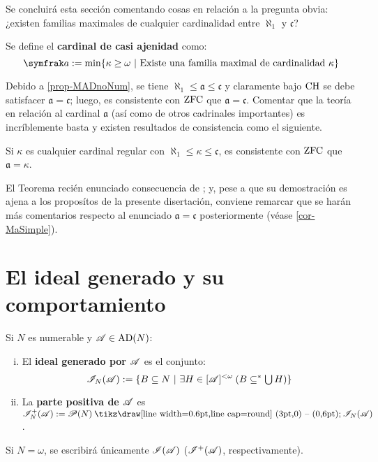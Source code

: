 	Se concluirá esta sección comentando cosas en relación a la pregunta obvia: ¿existen familias maximales de cualquier cardinalidad entre $\aleph_1$ y $\mathfrak{c}$?
	
	\begin{definicion}
		Se define el \textbf{cardinal de casi ajenidad} como: 
		$$ \mathfrak{a}:=\min\{ \kappa \geq \omega \tq \text{Existe una familia maximal de cardinalidad } \kappa \} $$
	\end{definicion}
	
	Debido a \ref{prop-MADnoNum}, se tiene $\aleph_1 \leq \mathfrak{a} \leq \mathfrak{c}$ y claramente bajo $\operatorname{CH}$ se debe satisfacer $\mathfrak{a}=\mathfrak{c}$; luego, es consistente con $\operatorname{ZFC}$ que $\mathfrak{a}=\mathfrak{c}$. Comentar que la teoría en relación al cardinal $\mathfrak{a}$ (así como de otros cadrinales importantes) es incríblemente basta y existen resultados de consistencia como el siguiente.
	
	\begin{teorema}\label{teo-stafa}
		Si $\kappa$ es cualquier cardinal regular con $\aleph_1 \leq \kappa \leq \mathfrak{c}$, es consistente con $\operatorname{ZFC}$ que $\mathfrak{a}=\kappa$.
	\end{teorema}

	El Teorema recién enunciado consecuencia de \cite[Teo.~5.1, p.~127]{kunenHandbook}; y, pese a que su demostración es ajena a los proposítos de la presente disertación, conviene remarcar que se harán más comentarios respecto al enunciado $\mathfrak{a}=\mathfrak{c}$ posteriormente (véase \ref{cor-MaSimple}).

	\section{El ideal generado y su comportamiento}
	\label{Sec-IdealGenerado}
	\index[sym]{$\ms{I}^+(\ms{A})$}
	\begin{definicion}\label{def-ideal}
		Si $N$ es numerable y $\mathscr{A} \in \operatorname{AD}(N)$:
		\begin{enumerate}[i)]
			\item El \textbf{ideal generado por $\mathscr{A}$} es el conjunto:
			$$ \mathscr{I}_N(\mathscr{A}) := \{ B \subseteq N \text{ $|$ } \exists H \in [\mathscr{A}]^{<\omega} \: ( B \subseteq^* \mbox{$\bigcup$}\, H ) \} $$
			\item La \textbf{parte positiva de $\mathscr{A}$} es $ \ms{I}_N^+(\ms{A}) := \ms{P}(N) \setminus \ms{I}_N(\ms{A})$.
		\end{enumerate}
		Si $N=\omega$, se escribirá únicamente $\mathscr{I}(\mathscr{A})$ ($\ms{I}^+(\ms{A})$, respectivamente).
	\end{definicion}

